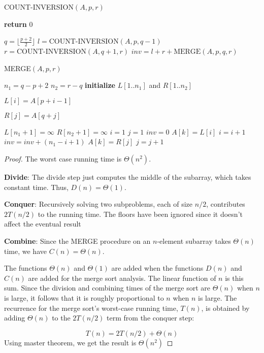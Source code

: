 \documentclass[a4paper]{article}
\begin{document}
\begin{algorithm}
  \caption{COUNT-INVERSION$(A,p,r)$}\label{alg:cap3}
  \begin{algorithmic}[1]
    \State \textbf{return} 0
    \EndIf

    \State $q =\lfloor\frac{p+2}2\rfloor $
    \State $l =\text{COUNT-INVERSION}(A,p, q-1)$
    \State $r = \text{COUNT-INVERSION}(A,q+1,r)$
    \State $inv =l+r+ \text{MERGE}(A,p,q,r)$

  \end{algorithmic}
\end{algorithm}
\begin{algorithm}
  \caption{MERGE$(A,p,r)$}\label{alg:cap4}
  \begin{algorithmic}[1]
    \State $n_1=q-p+2$
    \State $n_2=r-q$
    \State \textbf{initialize} $L[1..n_1]$ and $R[1..n_2]$

    \Statement $L[i]=A[p+i-1]$
    \EndFor

    \Statement $R[j]=A[q+j]$
    \EndFor

    \State $L\left[n_1+1\right]=\infty $
    \State $R\left[n_2+1\right]=\infty $
    \State $i=1 $
    \State $j=1 $
    \State $ inv =0 $
    \State $ A[k]=L[i] $
    \State $i=i+1 $
    \Else
    \State $inv=inv+\left(n_1-i+1\right) $
    \State $A[k]=R[j] $
    \State $j=j+1$
    \EndIf
    \EndFor
  \end{algorithmic}
\end{algorithm}
\begin{proof}
 The worst case running time is $\Theta(n^2)$.

 \textbf{Divide}: The divide step just computes the middle of the subarray, which takes constant time. Thus, $D(n)=\Theta(1)$.

\textbf{Conquer}: Recursively solving two subproblems, each of size $n / 2$, contributes $2 T(n / 2)$ to the running time. The floors have been ignored since it doesn't affect the eventual result

\textbf{Combine}: Since the MERGE procedure on an $n$-element subarray takes $\Theta(n)$ time, we have $C(n)=\Theta(n)$.

The functions $\Theta(n)$ and $\Theta(1)$ are added when the functions $D(n)$ and $C(n)$ are added for the merge sort analysis. The linear function of $n$ is this sum. Since the division and combining times of the merge sort are $\Theta(n)$ when $n$ is large, it follows that it is roughly proportional to $n$ when $n$ is large. The recurrence for the merge sort's worst-case running time, $T(n)$, is obtained by adding $\Theta(n)$ to the $2 T(n / 2)$ term from the conquer step:

$$
T(n)=2 T(n / 2)+\Theta(n) 
$$
Using master theorem, we get the result is $\Theta(n^2)$
\end{proof}
\end{document}
